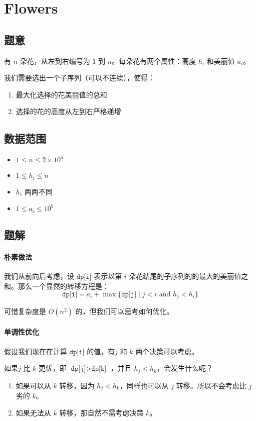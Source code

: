 \section{Flowers}
\subsection*{题意}
有 $n$ 朵花，从左到右编号为 $1$ 到 $n$。每朵花有两个属性：高度 $h_i$ 和美丽值 $a_i$。

我们需要选出一个子序列（可以不连续），使得：
\begin{enumerate}
\item 最大化选择的花美丽值的总和 
\item 选择的花的高度从左到右严格递增
\end{enumerate}
\subsection*{数据范围}
\begin{itemize}
\item $1 \leq n \leq 2 \times 10^5$
\item $1 \leq h_i \leq n$
\item $h_i$ 两两不同
\item $1 \leq a_i \leq 10^9$
\end{itemize}

\subsection*{题解}

\paragraph{朴素做法}
我们从前向后考虑，设 $\texttt{dp[i]}$ 表示以第 $i$ 朵花结尾的子序列的的最大的美丽值之和。那么一个显然的转移方程是：
$$
\texttt{dp[i]} = a_i + \max\{\texttt{dp[j]}\mid j<i \text{ and } h_j < h_i\}
$$

可惜复杂度是 $O(n^2)$ 的，但我们可以思考如何优化。

\paragraph{单调性优化}
假设我们现在在计算 $\texttt{dp[i]}$ 的值，有$j$ 和 $k$ 两个决策可以考虑。 

如果$j$ 比 $k$ 更优，即 $\texttt{dp[j]} > \texttt{dp[k]}$ ，并且 $h_j < h_k$，会发生什么呢？
\begin{enumerate}
\item 如果可以从 $k$ 转移，因为 $h_j < h_k $，同样也可以从 $j$ 转移。所以不会考虑比 $j$ 劣的 $k$。
\item 如果无法从 $k$ 转移，那自然不需考虑决策 $k$。
\end{enumerate}

